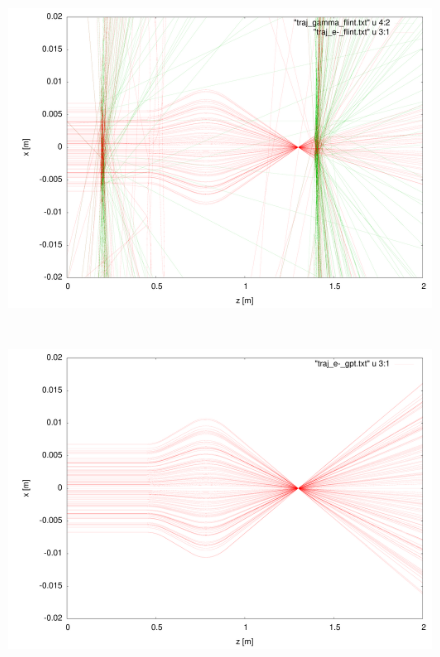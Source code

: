 \documentclass{beamer}
\newcommand{\ident}{\thesection.\thesubsection}
\newcommand{\ftitle}{\frametitle{\nameref{\ident}}}
\begin{document}
\begin{frame}
\begin{columns}
\begin{column}{4cm}
\begin{figure}
				\includegraphics[width=\columnwidth]{img/quadrupole_flint}
			\end{figure}
		\end{column}
	\end{columns}
\end{frame}

\begin{frame}
	\ftitle
	\begin{figure}
		\includegraphics[height=0.8\textheight]{img/quadrupole_gpt}
	\end{figure}
\end{frame}
\end{document}
